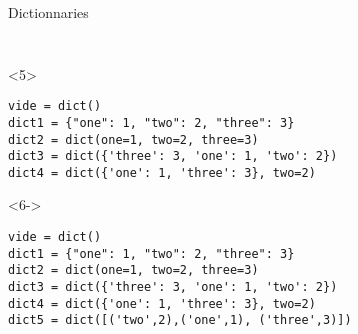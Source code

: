 \begin{frame}[fragile]{Dictionnaries}
\begin{center}
\begin{columns}[onlytextwidth]
\begin{column}{\textwidth}
\begin{onlyenv}
\begin{lstlisting}[style=python,morekeywords={for, in, range, list}]
 \end{lstlisting}
      \end{onlyenv}

      \begin{onlyenv}<5>
        \begin{lstlisting}[style=python,morekeywords={for, in, range, list}]
vide = dict()
dict1 = {"one": 1, "two": 2, "three": 3}
dict2 = dict(one=1, two=2, three=3)
dict3 = dict({'three': 3, 'one': 1, 'two': 2})
dict4 = dict({'one': 1, 'three': 3}, two=2)
 \end{lstlisting}
      \end{onlyenv}

      \begin{onlyenv}<6->
        \begin{lstlisting}[style=python,morekeywords={for, in, range, list}]
vide = dict()
dict1 = {"one": 1, "two": 2, "three": 3}
dict2 = dict(one=1, two=2, three=3)
dict3 = dict({'three': 3, 'one': 1, 'two': 2})
dict4 = dict({'one': 1, 'three': 3}, two=2)
dict5 = dict([('two',2),('one',1), ('three',3)]) \end{lstlisting}
      \end{onlyenv}

    \end{column}
  \end{columns}

  \end{center}

\end{frame}



